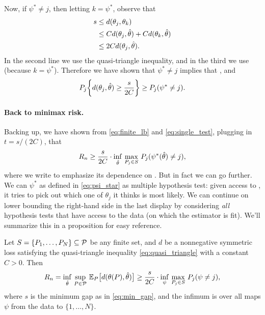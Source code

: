 \documentclass{article}
\begin{document}
Now, if $\psi^* \not= j$, then letting $k = \psi^*$, observe that   
\begin{align*}
s &\leq d(\theta_j,\theta_k) \\
&\leq C d(\theta_j,\hat{\theta}) + C d(\theta_k,\hat{\theta}) \\
&\leq 2C d(\theta_j,\hat{\theta}).
\end{align*}
In the second line we use the quasi-triangle inequality, and in the third we
use  (because $k 
=\psi^*$). Therefore we have shown that $\psi^* \not= j$ implies that  
, and 
\begin{equation}
\label{eq:single_test}
P_j \bigg\{ d(\theta_j, \hat{\theta}) \geq \frac{s}{2C} \bigg\} \geq 
P_j (\psi^* \not= j).
\end{equation}

\paragraph{Back to minimax risk.}

Backing up, we have shown from \eqref{eq:finite_lb} and \eqref{eq:single_test},
plugging in $t = s/(2C)$, that  
\[
R_n \geq \frac{s}{2C} \cdot \inf_{\hat{\theta}} \, \max_{P_j \in S} \, 
P_j (\psi^*(\hat{\theta}) \not= j),
\]
where we write \smash{$\psi^* = \psi^*(\htheta)$} to emphasize its dependence on
\smash{$\htheta$}. But in fact we can go further. We can $\psi^*$ as defined in 
\eqref{eq:psi_star} as multiple hypothesis test: given access to
\smash{$\htheta$}, it tries to pick out which one of $\theta_j$ it thinks is
most likely. We can continue on lower bounding the right-hand side in the last
display by considering \emph{all} hypothesis tests that have access to the data
(on which the estimator \smash{$\htheta$} is fit). We'll summarize this in a
proposition for easy reference. 

\begin{proposition}
\label{prop:standard_reduction}
Let $S = \{P_1,\dots,P_N\} \subseteq \mathcal{P}$ be any finite set, and $d$ be a
nonnegative symmetric loss satisfying the quasi-triangle inequality
\eqref{eq:quasi_triangle} with a constant $C>0$. Then 
\begin{equation}
\label{eq:standard_reduction}
R_n = \inf_{\hat{\theta}} \, \sup_{P \in \mathcal{P}} \, \mathbb{E}_P \big[ d(\theta(P), \hat{\theta})
\big] \geq \frac{s}{2C} \cdot \inf_\psi \, \max_{P_j \in S} \, P_j (\psi \not= 
j),  
\end{equation}
where $s$ is the minimum gap as in \eqref{eq:min_gap}, and the infimum is over
all maps $\psi$ from the data to $\{1,\dots,N\}$.  
\end{proposition}
\end{document}
